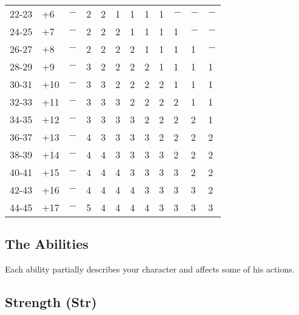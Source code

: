 \begin{table}[]
\begin{tabular}{llllllllllll}
22-23         & +6       & $-$                                      & 2   & 2   & 1   & 1   & 1   & 1   & $-$   & $-$   & $-$   \\
24-25         & +7       & $-$                                      & 2   & 2   & 2   & 1   & 1   & 1   & 1   & $-$   & $-$   \\
26-27         & +8       & $-$                                      & 2   & 2   & 2   & 2   & 1   & 1   & 1   & 1   & $-$   \\
28-29         & +9       & $-$                                      & 3   & 2   & 2   & 2   & 2   & 1   & 1   & 1   & 1   \\
30-31         & +10      & $-$                                      & 3   & 3   & 2   & 2   & 2   & 2   & 1   & 1   & 1   \\
32-33         & +11      & $-$                                      & 3   & 3   & 3   & 2   & 2   & 2   & 2   & 1   & 1   \\
34-35         & +12      & $-$                                      & 3   & 3   & 3   & 3   & 2   & 2   & 2   & 2   & 1   \\
36-37         & +13      & $-$                                      & 4   & 3   & 3   & 3   & 3   & 2   & 2   & 2   & 2   \\
38-39         & +14      & $-$                                      & 4   & 4   & 3   & 3   & 3   & 3   & 2   & 2   & 2   \\
40-41         & +15      & $-$                                      & 4   & 4   & 4   & 3   & 3   & 3   & 3   & 2   & 2   \\
42-43         & +16      & $-$                                      & 4   & 4   & 4   & 4   & 3   & 3   & 3   & 3   & 2   \\
44-45         & +17      & $-$                                      & 5   & 4   & 4   & 4   & 4   & 3   & 3   & 3   & 3  
\end{tabular}
\end{table}

				
\subsection{The Abilities}

				
Each ability partially describes your character and affects some of his actions.
				
\subsection{Strength (Str)}

